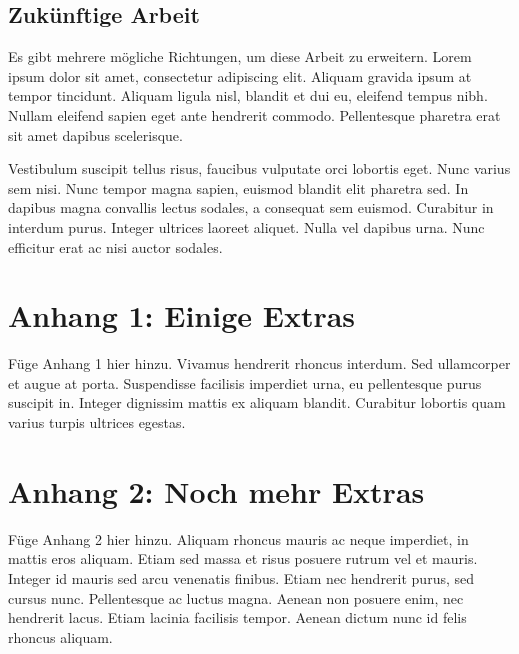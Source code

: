 \documentclass[listof=totoc,index=totoc,bibliography=totoc,12pt,german,a4paper,]{report}
\begin{document}
\section{Zukünftige Arbeit}\label{zukuxfcnftige-arbeit}

Es gibt mehrere mögliche Richtungen, um diese Arbeit zu erweitern. Lorem
ipsum dolor sit amet, consectetur adipiscing elit. Aliquam gravida ipsum
at tempor tincidunt. Aliquam ligula nisl, blandit et dui eu, eleifend
tempus nibh. Nullam eleifend sapien eget ante hendrerit commodo.
Pellentesque pharetra erat sit amet dapibus scelerisque.

Vestibulum suscipit tellus risus, faucibus vulputate orci lobortis eget.
Nunc varius sem nisi. Nunc tempor magna sapien, euismod blandit elit
pharetra sed. In dapibus magna convallis lectus sodales, a consequat sem
euismod. Curabitur in interdum purus. Integer ultrices laoreet aliquet.
Nulla vel dapibus urna. Nunc efficitur erat ac nisi auctor sodales.

\chapter*{Anhang 1: Einige Extras}\label{anhang-1-einige-extras}


Füge Anhang 1 hier hinzu. Vivamus hendrerit rhoncus interdum. Sed
ullamcorper et augue at porta. Suspendisse facilisis imperdiet urna, eu
pellentesque purus suscipit in. Integer dignissim mattis ex aliquam
blandit. Curabitur lobortis quam varius turpis ultrices egestas.

\chapter*{Anhang 2: Noch mehr Extras}\label{anhang-2-noch-mehr-extras}


Füge Anhang 2 hier hinzu. Aliquam rhoncus mauris ac neque imperdiet, in
mattis eros aliquam. Etiam sed massa et risus posuere rutrum vel et
mauris. Integer id mauris sed arcu venenatis finibus. Etiam nec
hendrerit purus, sed cursus nunc. Pellentesque ac luctus magna. Aenean
non posuere enim, nec hendrerit lacus. Etiam lacinia facilisis tempor.
Aenean dictum nunc id felis rhoncus aliquam.

\footnotesize
\singlespacing
\setlength{\parindent}{0in}
\end{document}
